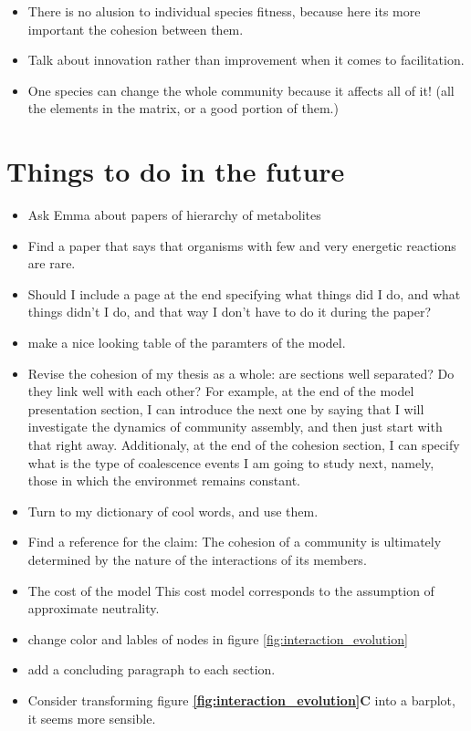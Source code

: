 \documentclass[titlepage,11pt]{article}
\begin{document}
\begin{linenumbers}
\begin{singlespace}
\begin{itemize}
	\item There is no alusion to individual species fitness, because here its more important the cohesion between them.
	\item Talk about innovation rather than improvement when it comes to facilitation.
	\item One species can change the whole community because it affects all of it! (all the elements in the matrix, or a good portion of them.)
\end{itemize}
\newpage
\section{Things to do in the future}
\begin{itemize}
	\item Ask Emma about papers of hierarchy of metabolites
	\item Find a paper that says that organisms with few and very energetic reactions are rare.
	\item Should I include a page at the end specifying what things did I do, and what things didn't I do, and that way I don't have to do it during the paper?
	\item make a nice looking table of the paramters of the model.
	\item Revise the cohesion of my thesis as a whole: are sections well separated? Do they link well with each other? For example, at the end of the model presentation section, I can introduce the next one by saying that I will investigate the dynamics of community assembly, and then just start with that right away. Additionaly, at the end of the cohesion section, I can specify what is the type of coalescence events I am going to study next, namely, those in which the environmet remains constant.
	\item Turn to my dictionary of cool words, and use them.
	\item Find a reference for the claim: The cohesion of a community is ultimately determined by the nature of the interactions of its members.
	\item The cost of the model This cost model corresponds to the assumption of approximate neutrality.
	\item change color and lables of nodes in figure \ref{fig:interaction_evolution}
	\item add a concluding paragraph to each section.
	\item Consider transforming figure \textbf{\ref{fig:interaction_evolution}C} into a barplot, it seems more sensible.

\end{itemize}
\end{singlespace}
\end{linenumbers}
\end{document}
